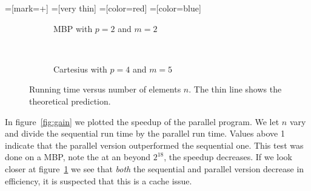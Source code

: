 =[mark=+]
=[very thin]
=[color=red]
=[color=blue]
\begin{figure}
	\centering
	\begin{subfigure}[b]{0.5\textwidth}
		\caption{MBP with $p=2$ and $m=2$}
	\end{subfigure}~
	\begin{subfigure}[b]{0.5\textwidth}
		\caption{Cartesius with $p=4$ and $m=5$}
	\end{subfigure}
	\caption{Running time versus number of elements $n$. The thin line shows the theoretical prediction.}
	\label{fig:basicplot}
\end{figure}

In figure~\ref{fig:gain} we plotted the speedup of the parallel program. We let $n$ vary and divide the sequential run time by the parallel run time. Values above 1 indicate that the parallel version outperformed the sequential one. This test was done on a MBP, note the at an beyond $2^{18}$, the speedup decreases. If we look closer at figure~\ref{fig:basicplot} we see that \emph{both} the sequential and parallel version decrease in efficiency, it is suspected that this is a cache issue.

